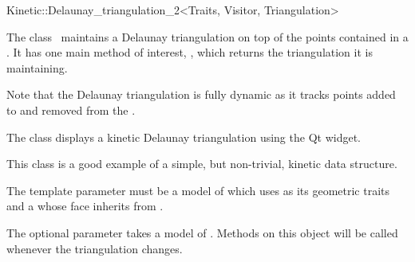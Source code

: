 

\begin{ccRefClass}{Kinetic::Delaunay_triangulation_2<Traits, Visitor, Triangulation>}  %


\ccDefinition
  
The class \ccRefName\ maintains a Delaunay triangulation on top of the
points contained in a . It has one
main method of interest, , which returns the
triangulation it is maintaining.

Note that the Delaunay triangulation is fully dynamic as it tracks points added to and removed from the .

The class  displays a kinetic Delaunay
triangulation using the Qt widget.

This class is a good example of a simple, but non-trivial, kinetic
data structure.

The  template parameter must be a model of
 which uses
 as its geometric traits and a
 whose face inherits from
.

The optional  parameter takes a model of
. Methods on this object will be called
whenever the triangulation changes.


\ccIsModel



\ccTypes



\end{ccRefClass}
